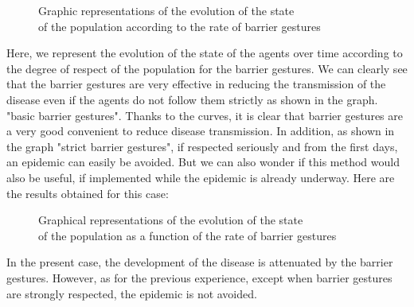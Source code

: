\documentclass[a4paper, 12pt]{report}
\begin{document}
\begin{figure}[h]
	\centering
	\qquad
	\centering
	\qquad
	\caption{Graphic representations of the evolution of the state \\ of the population according to the rate of barrier gestures}

\end{figure}

\newpage

Here, we represent the evolution of the state of the agents over time according to the degree of respect of the population for the barrier gestures.
We can clearly see that the barrier gestures are very effective in reducing the transmission of the disease even if the agents do not follow them strictly as shown in the graph.
"basic barrier gestures".
Thanks to the curves, it is clear that barrier gestures are a very good
convenient to reduce disease transmission. In addition, as shown in the graph "strict barrier gestures", if respected seriously and from the first days, an epidemic can easily
be avoided. But we can also wonder if this method would also be useful, if implemented while the epidemic is already underway. Here are the results obtained for this case:

\begin{figure}[h]
	\centering
	\qquad
	\centering
	\qquad
	\caption{Graphical representations of the evolution of the state \\ of the population as a function of the rate of barrier gestures}

\end{figure}

\newpage

In the present case, the development of the disease is attenuated by the barrier gestures. However, as for the previous experience, except when barrier gestures are strongly respected,
the epidemic is not avoided.
\end{document}
